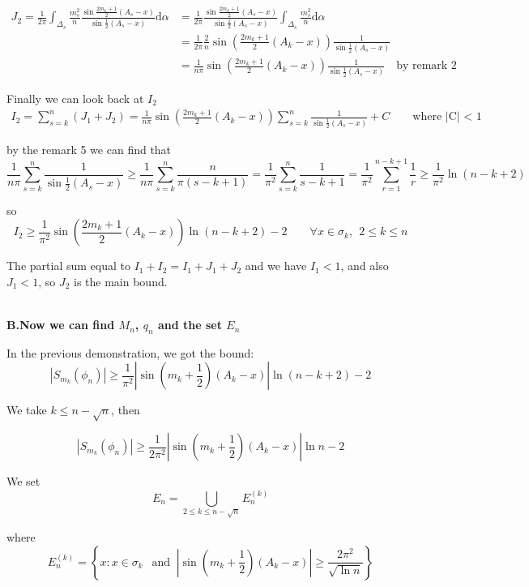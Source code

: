 \documentclass{article}
\begin{document}
\begin{enumerate}
\begin{align*}
    J_2= \frac{1}{2\pi}\int_{\Delta_s}\frac{m_s^2}{n}\frac{\sin\frac{2m_k+1}{2}(A_s-x)}{\sin\frac{1}{2}(A_s-x)}\mathrm{d}\alpha&=\frac{1}{2\pi}\frac{\sin\frac{2m_k+1}{2}(A_s-x)}{\sin\frac{1}{2}(A_s-x)}\int_{\Delta_s}\frac{m_s^2}{n}\mathrm{d}\alpha\\
    &=\frac{1}{2\pi}\frac{2}{n}\sin\left(\frac{2m_k+1}{2}(A_k-x) \right)\frac{1}{\sin\frac{1}{2}(A_s-x)}\\
    &= \frac{1}{n\pi}\sin\left(\frac{2m_k+1}{2}(A_k-x) \right)\frac{1}{\sin\frac{1}{2}(A_s-x)}\quad  \text{by remark 2}
\end{align*}

Finally we can look back at $ I_2 $
\begin{align*}
    I_2=\sum_{s=k}^{n}(J_1+J_2)=\frac{1}{n\pi}\sin\left(\frac{2m_k+1}{2}(A_k-x) \right)\sum_{s=k}^{n}\frac{1}{\sin\frac{1}{2}(A_s-x)}+C \quad \quad \text{where |C| < 1}
\end{align*}

by the remark 5 we can find that 
\[ \frac{1}{n\pi}\sum_{s=k}^{n}\frac{1}{\sin\frac{1}{2}(A_s-x)} \geqslant \frac{1}{n\pi}\sum_{s=k}^{n}\frac{n}{\pi(s-k+1)}=\frac{1}{\pi^2}\sum_{s=k}^{n}\frac{1}{s-k+1} =\frac{1}{\pi^2}\sum_{r=1}^{n-k+1}\frac{1}{r} \geqslant \frac{1}{\pi^2}\ln(n-k+2) \] 


so 
\[ I_2 \geqslant \frac{1}{\pi^2}\sin\left(\frac{2m_k+1}{2}(A_k-x) \right)\ln(n-k+2)-2  \quad \quad \forall x \in \sigma_k, \ \ 2 \leqslant k \leqslant n\] 

\end{enumerate}
The partial sum equal to $ I_1 +I_2 = I_1+J_1+J_2$ and we have $ I_1 < 1$, and also $J_1 < 1 $, so $ J_2 $ is the main bound.\par
~\\

\textbf{B.Now we can find $ M_n $, $ q_n $ and the set $ E_n$ }
 


In the previous demonstration, we got the bound:
\[| S_{m_k}(\phi_n)|\geqslant \frac{1}{\pi^2}|\sin(m_k +\frac{1}{2})(A_k-x)|\ln(n-k+2) -2 \]

We take $ k \leqslant n - \sqrt{n} $, then

\[  | S_{m_k}(\phi_n)| \geqslant \frac{1}{2\pi^2}|\sin(m_k +\frac{1}{2})(A_k-x)|\ln n-2\]

We set \[ E_n= \bigcup_{2 \leqslant k \leqslant n-\sqrt{n}}E_n^{(k)} \]

where \[E_n^{(k)}=\left\{ x: x \in \sigma_k \ \ \text{ and } \ |\sin(m_k +\frac{1}{2})(A_k-x)| \geqslant \frac{2\pi^2}{\sqrt{\ln n}}\right\}\]
\end{document}
